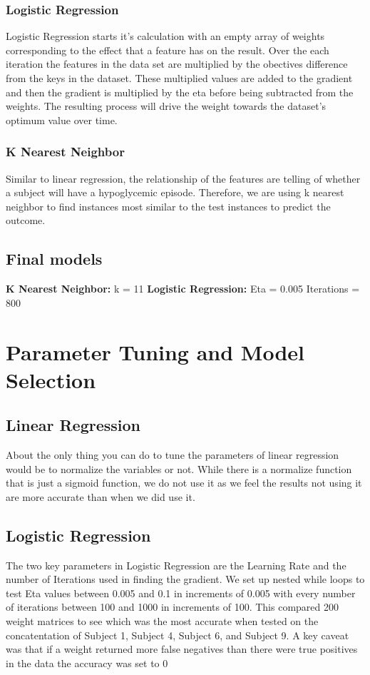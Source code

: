 \documentclass[11pt,a4paper]{article}
\begin{document}
\subsubsection{Logistic Regression}
Logistic Regression starts it's calculation with an empty array of weights corresponding to the effect that a feature has on the result. Over the each iteration the features in the data set are multiplied by the obectives difference from the keys in the dataset. These multiplied values are added to the gradient and then the gradient is multiplied by the eta before being subtracted from the weights. The resulting process will drive the weight towards the dataset's optimum value over time.
\subsubsection{K Nearest Neighbor}
Similar to linear regression, the relationship of the features are telling of whether a subject will have a hypoglycemic episode. Therefore, we are using k nearest neighbor to find instances most similar to the test instances to predict the outcome.

\subsection{Final models}
\textbf{K Nearest Neighbor: }k = 11
\textbf{Logistic Regression: }Eta = 0.005  Iterations = 800


\section{Parameter Tuning and Model Selection}
\subsection{Linear Regression}
About the only thing you can do to tune the parameters of linear regression would be to normalize the variables or not. While there is a normalize function that is just a sigmoid function, we do not use it as we feel the results not using it are more accurate than when we did use it.
\subsection{Logistic Regression}
The two key parameters in Logistic Regression are the Learning Rate and the number of Iterations used in finding the gradient. We set up nested while loops to test Eta values between 0.005 and 0.1 in increments of 0.005 with every number of iterations between 100 and 1000 in increments of 100. This compared 200 weight matrices to see which was the most accurate when tested on the concatentation of Subject 1, Subject 4, Subject 6, and Subject 9. A key caveat was that if a weight returned more false negatives than there were true positives in the data the accuracy was set to 0%
\end{document}
